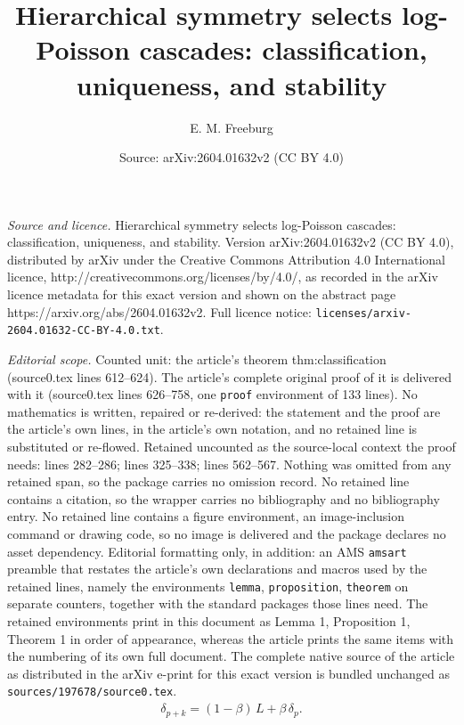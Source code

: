\documentclass[10pt,a4paper]{amsart}
\title{Hierarchical symmetry selects log-Poisson cascades: classification, uniqueness, and stability}
\author{E. M. Freeburg}
\date{Source: arXiv:2604.01632v2 (CC BY 4.0)}
\begin{document}
\maketitle

\noindent\emph{Source and licence.} Hierarchical symmetry selects log-Poisson cascades: classification, uniqueness, and stability. Version arXiv:2604.01632v2 (CC BY 4.0), distributed by arXiv under the Creative Commons Attribution 4.0 International licence, http://creativecommons.org/licenses/by/4.0/, as recorded in the arXiv licence metadata for this exact version and shown on the abstract page https://arxiv.org/abs/2604.01632v2. Full licence notice: \texttt{licenses/arxiv-2604.01632-CC-BY-4.0.txt}.\par\smallskip

\noindent\textit{Editorial scope.} Counted unit: the article's theorem thm:classification (source0.tex lines 612--624). The article's complete original proof of it is delivered with it (source0.tex lines 626--758, one \texttt{proof} environment of 133 lines). No mathematics is written, repaired or re-derived: the statement and the proof are the article's own lines, in the article's own notation, and no retained line is substituted or re-flowed.  Retained uncounted as the source-local context the proof needs: lines 282--286; lines 325--338; lines 562--567.  Nothing was omitted from any retained span, so the package carries no omission record.  No retained line contains a citation, so the wrapper carries no bibliography and no bibliography entry.  No retained line contains a figure environment, an image-inclusion command or drawing code, so no image is delivered and the package declares no asset dependency.  Editorial formatting only, in addition: an AMS \texttt{amsart} preamble that restates the article's own declarations and macros used by the retained lines, namely the environments \texttt{lemma}, \texttt{proposition}, \texttt{theorem} on separate counters, together with the standard packages those lines need.  The retained environments print in this document as Lemma 1, Proposition 1, Theorem 1 in order of appearance, whereas the article prints the same items with the numbering of its own full document.  The complete native source of the article as distributed in the arXiv e-print for this exact version is bundled unchanged as \texttt{sources/197678/source0.tex}.
\begin{align}\label{eq:A1}
  \delta_{p+k}
  = (1 - \beta)\,L + \beta\,\delta_p.
  \tag{$*$}
\end{align}
\end{document}
